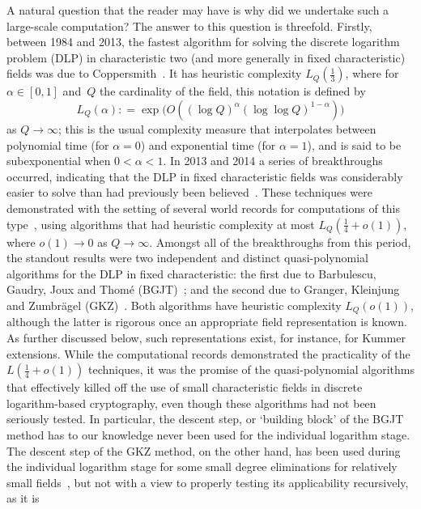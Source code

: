 \documentclass[11pt]{llncs}
\newcommand{\defeq}{\mathrel{\mathop:}=}
\begin{document}
A natural question that the reader may have is why did we undertake such a large-scale computation? The answer to this question is threefold. 
Firstly, between 1984 and 2013, the fastest algorithm for solving the discrete logarithm problem (DLP) in characteristic two (and more generally in fixed 
characteristic) fields was due to Coppersmith~\cite{coppersmith}. It has heuristic complexity $L_Q(\frac 1 3)$, where for $\alpha \in [0,1]$ and~$Q$ the
cardinality of the field, this notation is defined by
\[ L_Q( \alpha) \defeq \exp \big( O( (\log{Q})^{\alpha} (\log{\log{Q}})^{1-\alpha} ) \big) \]
as $Q \to \infty$; this is the usual complexity measure that interpolates between polynomial time (for $\alpha = 0$) and exponential time
(for $\alpha = 1$), and is said to be subexponential when $0 < \alpha < 1$. In 2013 and 2014 a series of breakthroughs occurred, indicating that the 
DLP in fixed characteristic fields was considerably easier to solve than had previously been believed~\cite{GGMZ13a,Joux13b,GGMZ13b,BGJT13,GKZ14a,GKZ14eprint,JP14,GKZ18}. 
These techniques were demonstrated with the setting of several world records for computations of this type~\cite{1778Ann,1971Ann,4080Ann,6120Ann,6168Ann,4404Ann,9234Ann}, using algorithms that had heuristic complexity at most $L_Q(\frac 1 4 + o(1))$, where $o(1) \to 0$ as $Q \to \infty$.
Amongst all of the breakthroughs from this period, the standout results were two independent and distinct quasi-polynomial algorithms for the DLP 
in fixed characteristic: the first due to Barbulescu, Gaudry, Joux and Thom\'e (BGJT)~\cite{BGJT13}; and the second due to Granger, Kleinjung and 
Zumbr\"agel (GKZ)~\cite{GKZ14eprint,GKZ18}. Both algorithms have heuristic complexity $L_Q(o(1))$, although the latter is rigorous once an 
appropriate field representation is known. As further discussed below, such representations exist, for instance, for Kummer extensions. While 
the computational records demonstrated the practicality of the $L(\frac 1 4 + o(1))$ techniques, it was the promise of the quasi-polynomial
algorithms that effectively killed off the use of small characteristic fields in discrete logarithm-based cryptography, even though these algorithms
had not been seriously tested. In particular, the descent step, or `building block' of the BGJT method has to our knowledge never been used for the 
individual logarithm stage. The descent step of the GKZ method, on the other hand, has been used during the individual logarithm stage for some small
degree eliminations for relatively small fields~\cite{1279Ann,JP14}, but not with a view to properly testing its applicability recursively, as it is
\end{document}
